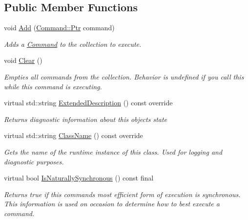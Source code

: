 \subsection*{Public Member Functions}
\begin{DoxyCompactItemize}
\item 
void \mbox{\hyperlink{class_command_lib_1_1_sequential_commands_af0100e15f7897471ce84802ab6c25e00}{Add}} (\mbox{\hyperlink{class_command_lib_1_1_command_a3b3e4f00144373299df5c6bb1acc319d}{Command\+::\+Ptr}} command)
\begin{DoxyCompactList}\small\item\em Adds a \mbox{\hyperlink{class_command_lib_1_1_command}{Command}} to the collection to execute.\end{DoxyCompactList}\item 
void \mbox{\hyperlink{class_command_lib_1_1_sequential_commands_ad022ea238a8c3ac1c1f71a5b71f6d94f}{Clear}} ()
\begin{DoxyCompactList}\small\item\em Empties all commands from the collection. Behavior is undefined if you call this while this command is executing. \end{DoxyCompactList}\item 
virtual std\+::string \mbox{\hyperlink{class_command_lib_1_1_sequential_commands_a8109d8d9b2c4a191cad02164ca173709}{Extended\+Description}} () const override
\begin{DoxyCompactList}\small\item\em Returns diagnostic information about this object\textquotesingle{}s state \end{DoxyCompactList}\item 
\mbox{\label{class_command_lib_1_1_sequential_commands_abbfd93499d508c3f0d2d817bd59e7080}} 
virtual std\+::string \mbox{\hyperlink{class_command_lib_1_1_sequential_commands_abbfd93499d508c3f0d2d817bd59e7080}{Class\+Name}} () const override
\begin{DoxyCompactList}\small\item\em Gets the name of the runtime instance of this class. Used for logging and diagnostic purposes.  \end{DoxyCompactList}\item 
\mbox{\label{class_command_lib_1_1_sequential_commands_a47c2a881bfeab639064e36d202e32e0f}} 
virtual bool \mbox{\hyperlink{class_command_lib_1_1_sequential_commands_a47c2a881bfeab639064e36d202e32e0f}{Is\+Naturally\+Synchronous}} () const final
\begin{DoxyCompactList}\small\item\em Returns true if this command\textquotesingle{}s most efficient form of execution is synchronous. This information is used on occasion to determine how to best execute a command.  \end{DoxyCompactList}\end{DoxyCompactItemize}
